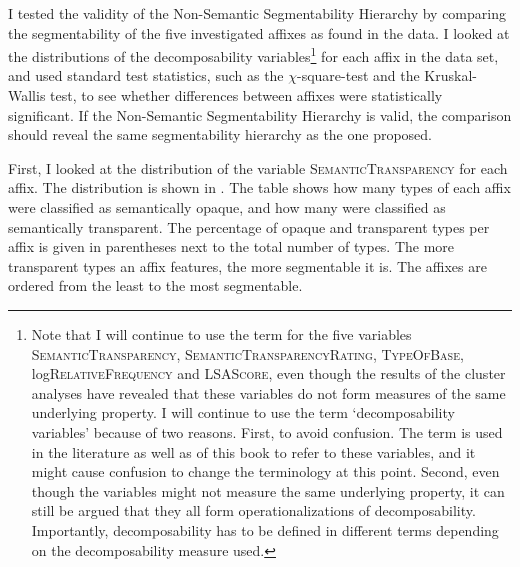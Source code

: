 I tested the validity of the Non-Semantic Segmentability Hierarchy by comparing the segmentability of the five investigated affixes as found in the data. I looked at the distributions of the decomposability variables\footnote{Note that I will continue to use the term  for the five variables \textsc{SemanticTransparency}, \textsc{SemanticTransparencyRating}, \textsc{TypeOfBase}, log\textsc{RelativeFrequency} and \textsc{LSAScore}, even though the results of the cluster analyses have revealed that these variables do not form measures of the same underlying property. I will continue to use the term `decomposability variables' because of two reasons. First, to avoid confusion. The term is used in the literature as well as  of this book to refer to these variables, and it might cause confusion to change the terminology at this point. Second, even though the variables might not measure the same underlying property, it can still be argued that they all form operationalizations of decomposability. Importantly, decomposability has to be defined in different terms depending on the decomposability measure used.} for each affix in the data set, and used standard test statistics, such as the $\chi$-square-test and the Kruskal-Wallis test, to see whether differences between affixes were statistically significant.
If the Non-Semantic Segmentability Hierarchy is valid, the comparison should reveal the same segmentability hierarchy  as the one proposed. 


First, I looked at the distribution of the variable \textsc{SemanticTransparency} for each affix. The distribution is shown in . The table shows how many types of each affix were classified as semantically opaque, and how many were classified as semantically transparent. The percentage of opaque and transparent types per affix is given in parentheses next to the total number of  types. The more transparent types an affix features, the more segmentable it is. The affixes are ordered from the least to the most segmentable.




